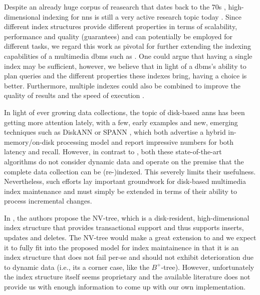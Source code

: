 Despite an already huge corpus of reasearch that dates back to the 70s \cite{Bentley:1975Multidimensional,Guttmann:1984RTrees,Beckmann:1990RTree,Indyk1998:Approximate,Weber:1998Va,Jegou:2010Product}, high-dimensional indexing for \acrshort{nns} is still a very active research topic today \cite{Shimomura:2021Survey,Kraska:2018Case}. Since different index structures provide different properties in terms of scalability, performance and quality (guarantees) and can potentially be employed for different tasks, we regard this work as pivotal for further extending the indexing capabilities of a multimedia \acrshort{dbms} such as \cottontail{}. One could argue that having a single index may be sufficient, however, we believe that in light of a \acrshort{dbms}'s ability to plan queries and the different properties these indexes bring, having a choice is better. Furthermore, multiple indexes could also be combined to improve the quality of results and the speed of execution \cite{Giangreco:2018Database}.

In light of ever growing data collections, the topic of disk-based \acrshort{anns} has been getting more attention lately, with a few, early examples \cite{Lejsek:2011NVTree,Lejsek:2009NVTree,Gudmundsson:2010Large} and new, emerging techniques such as DiskANN \cite{Jayaram:2019DiskANN} or SPANN \cite{Chen:2021SPANN}, which both advertise a hybrid in-memory/on-disk processing model and report impressive numbers for both latency and recall. However, in contrast to \cite{Lejsek:2011NVTree,Lejsek:2009NVTree,Hojsgaard:2019Index}, both these state-of-the-art algorithms do not consider dynamic data and operate on the premise that the complete data collection can be (re-)indexed. This severely limits their usefulness. Nevertheless, such efforts lay important groundwork for disk-based multimedia index maintenance and must simply be extended in terms of their ability to process incremental changes.

In \cite{Lejsek:2011NVTree,Lejsek:2009NVTree}, the authors propose the NV-tree, which is a disk-resident, high-dimensional index structure that provides transactional support \cite{Lejsek:2018Transactional} and thus supports inserts, updates and deletes. The NV-tree would make a great extension to \cottontail{} and we expect it to fully fit into the proposed model for index maintainence in that it is an index structure that does not fail per-se and should not exhibit deterioration due to dynamic data (i.e., its a corner case, like the $B^{+}$-tree). However, unfortunately the index structure itself seems proprietary and the available literature does not provide us with enough information to come up with our own implementation.

